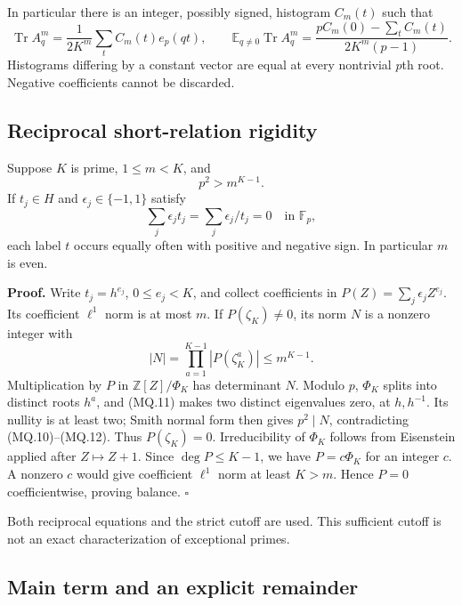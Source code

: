 In particular there is an integer, possibly signed, histogram \(C_m(t)\) such that \[
 \operatorname{Tr} A_q^m=\frac1{2K^m}\sum_tC_m(t)e_p(qt),\qquad
 \mathbb E_{q\ne0}\operatorname{Tr} A_q^m
 =\frac{pC_m(0)-\sum_tC_m(t)}{2K^m(p-1)}. \tag{MQ.9}
\] Histograms differing by a constant vector are equal at every nontrivial \(p\)th root. Negative coefficients cannot be discarded.

\subsection{Reciprocal short-relation rigidity}\label{magnetic:reciprocal-short-relation-rigidity}

\begin{lemma}\label{pass1:magnetic-3} Suppose \(K\) is prime, \(1\leq m<K\), and \[
 p^2>m^{K-1}. \tag{MQ.10}
\] If \(t_j\in H\) and \(\epsilon_j\in\{-1,1\}\) satisfy \[
 \sum_j\epsilon_jt_j=\sum_j\epsilon_j/t_j=0\quad\text{in }\mathbb F_p,
 \tag{MQ.11}
\] each label \(t\) occurs equally often with positive and negative sign. In particular \(m\) is even.
\end{lemma}

\textbf{Proof.} Write \(t_j=h^{e_j}\), \(0\leq e_j<K\), and collect coefficients in \(P(Z)=\sum_j\epsilon_jZ^{e_j}\). Its coefficient \(\ell^1\) norm is at most \(m\). If \(P(\zeta_K)\ne0\), its norm \(N\) is a nonzero integer with \[
 |N|=\prod_{a=1}^{K-1}|P(\zeta_K^a)|\leq m^{K-1}. \tag{MQ.12}
\] Multiplication by \(P\) in \(\mathbb Z[Z]/\Phi_K\) has determinant \(N\). Modulo \(p\), \(\Phi_K\) splits into distinct roots \(h^a\), and (MQ.11) makes two distinct eigenvalues zero, at \(h,h^{-1}\). Its nullity is at least two; Smith normal form then gives \(p^2\mid N\), contradicting (MQ.10)--(MQ.12). Thus \(P(\zeta_K)=0\). Irreducibility of \(\Phi_K\) follows from Eisenstein applied after \(Z\mapsto Z+1\). Since \(\deg P\leq K-1\), we have \(P=c\Phi_K\) for an integer \(c\). A nonzero \(c\) would give coefficient \(\ell^1\) norm at least \(K>m\). Hence \(P=0\) coefficientwise, proving balance. \(\square\)

Both reciprocal equations and the strict cutoff are used. This sufficient cutoff is not an exact characterization of exceptional primes.

\subsection{Main term and an explicit remainder}\label{magnetic:main-term-and-an-explicit-remainder}

